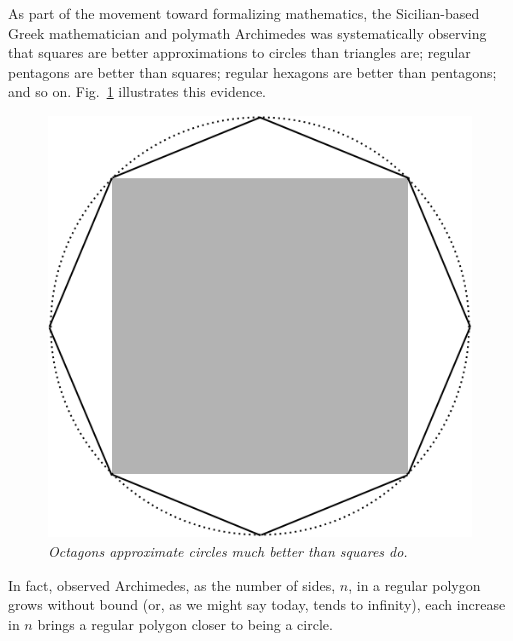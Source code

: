As part of the movement toward formalizing mathematics, the
Sicilian-based Greek mathematician and polymath Archimedes 
was systematically observing that squares are better approximations to
circles than triangles are; regular pentagons are better than squares;
regular hexagons are better than pentagons; and so on.  
Fig.~\ref{fig:approxcircle} illustrates this evidence.
%
\begin{figure}[htb]
\begin{center}
       \includegraphics[scale=0.25]{FiguresArithmetic/ApproxCircle}
\caption{{\it Octagons approximate circles much better than squares do.}
\label{fig:approxcircle}}
\end{center}
\end{figure}
In fact, observed Archimedes, as the number of sides, $n$, in a
regular polygon grows without bound (or, as we might say today, tends
to infinity), each increase in $n$ brings a regular polygon closer to
being a circle.

